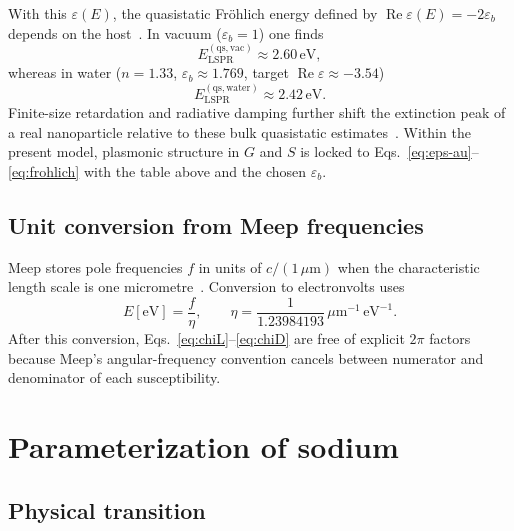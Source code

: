 \documentclass[11pt,a4paper]{article}
\begin{document}
With this $\varepsilon(E)$, the quasistatic Fr\"{o}hlich energy defined by
$\operatorname{Re}\varepsilon(E)=-2\varepsilon_b$ depends on the host~\citep{bohren1983,maier2007}.  In vacuum
($\varepsilon_b=1$) one finds
\begin{equation}
  E_{\mathrm{LSPR}}^{\mathrm{(qs,vac)}}
  \approx
  2.60\,\mathrm{eV},
\end{equation}
whereas in water ($n=1.33$, $\varepsilon_b\approx 1.769$, target
$\operatorname{Re}\varepsilon\approx-3.54$)
\begin{equation}
  E_{\mathrm{LSPR}}^{\mathrm{(qs,water)}}
  \approx
  2.42\,\mathrm{eV}.
\end{equation}
Finite-size retardation and radiative damping further shift the extinction peak
of a real nanoparticle relative to these bulk quasistatic estimates~\citep{bohren1983,maier2007}.  Within the
present model, plasmonic structure in $G$ and $S$ is locked to
Eqs.~\eqref{eq:eps-au}--\eqref{eq:frohlich} with the table above and the chosen
$\varepsilon_b$.

\subsection{Unit conversion from Meep frequencies}

Meep stores pole frequencies $f$ in units of $c/(1\,\mu\mathrm{m})$ when the
characteristic length scale is one micrometre~\citep{oskooi2010,meepdocs}.  Conversion to electronvolts uses
\begin{equation}
  E[\mathrm{eV}]
  =
  \frac{f}{\eta},
  \qquad
  \eta
  =
  \frac{1}{1.23984193}\,\mu\mathrm{m}^{-1}\,\mathrm{eV}^{-1}.
\end{equation}
After this conversion, Eqs.~\eqref{eq:chiL}--\eqref{eq:chiD} are free of
explicit $2\pi$ factors because Meep's angular-frequency convention cancels
between numerator and denominator of each susceptibility.

\section{Parameterization of sodium}
\label{sec:na}

\subsection{Physical transition}
\end{document}
